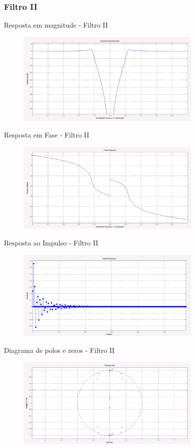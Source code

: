 \documentclass{beamer}
\begin{document}
\subsubsection{Filtro II}
	\begin{frame}{Resposta em magnitude - Filtro II}
		\begin{figure}[ht]
			\centering
			\includegraphics[width=9cm]{../pictures/Filtro2/RespMagnitudeFiltro2.png}
			\label{fig:magnitude1}
		\end{figure}
	\end{frame}
	\begin{frame}{Resposta em Fase - Filtro II}
		\begin{figure}[ht]
			\centering
			\includegraphics[width=9cm]{../pictures/Filtro2/RespFaseFiltro2.png}
			\label{fig:magnitude1}
		\end{figure}
	\end{frame}
	\begin{frame}{Resposta ao Impulso - Filtro II}
		\begin{figure}[ht]
			\centering
			\includegraphics[width=9cm]{../pictures/Filtro2/RespImpulsoFiltro2.png}
			\label{fig:magnitude1}
		\end{figure}
	\end{frame}
	\begin{frame}{Diagrama de polos e zeros - Filtro II}
		\begin{figure}[ht]
			\centering
			\includegraphics[width=9cm]{../pictures/Filtro2/DiagramaFiltro2.png}
			\label{fig:magnitude1}
		\end{figure}
	\end{frame}
	
\end{document}
